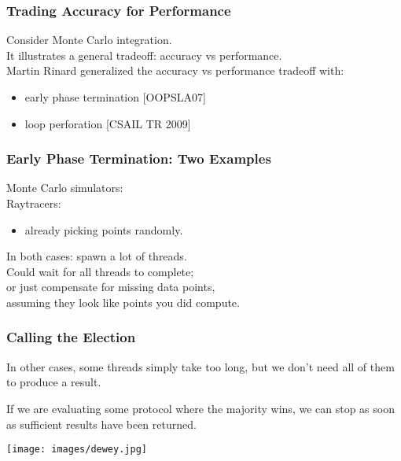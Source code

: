\begin{frame}
  \frametitle{Trading Accuracy for Performance}


    Consider Monte Carlo integration.\\
    It illustrates a general tradeoff: accuracy vs performance.\\
  
    Martin Rinard generalized the accuracy vs performance tradeoff with:
      \begin{itemize}
        \item early phase termination [OOPSLA07]
        \item loop perforation [CSAIL TR 2009]
      \end{itemize}

\end{frame}



\begin{frame}
  \frametitle{Early Phase Termination: Two Examples}



Monte Carlo simulators: \\
Raytracers:
\begin{itemize}
\item already picking points randomly.
\end{itemize}

In both cases: spawn a lot of threads.\\[1em]
Could wait for all threads to complete;\\
or just compensate for missing data points,\\
assuming they look like points you did compute.


\end{frame}



\begin{frame}
\frametitle{Calling the Election}

In other cases, some threads simply take too long, but we don't need all of them to produce a result. 

If we are evaluating some protocol where the majority wins, we can stop as soon as sufficient results have been returned.

\begin{center}
	\texttt{[image: images/dewey.jpg]}
\end{center}


\end{frame}


